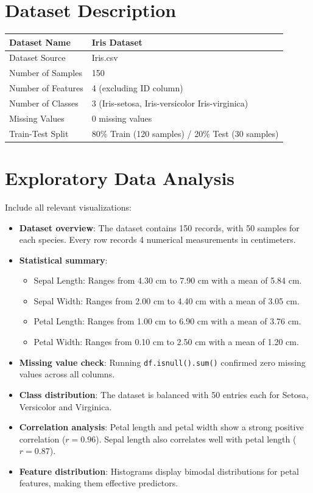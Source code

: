 \documentclass[12pt,a4paper]{article}
\begin{document}
\section{Dataset Description}
\begin{longtable}{|p{6cm}|p{8cm}|}
\hline
Dataset Name & Iris Dataset \\ \hline
Dataset Source & Iris.csv \\ \hline
Number of Samples & 150 \\ \hline
Number of Features & 4 (excluding ID column) \\ \hline
Number of Classes & 3 (Iris-setosa, Iris-versicolor Iris-virginica) \\ \hline
Missing Values & 0 missing values \\ \hline
Train-Test Split & 80\% Train (120 samples) / 20\% Test (30 samples) \\ \hline
\end{longtable}

\section{Exploratory Data Analysis}
Include all relevant visualizations:
\begin{itemize}
\item \textbf{Dataset overview}: The dataset contains 150 records, with 50 samples for each species. Every row records 4 numerical measurements in centimeters.
\item \textbf{Statistical summary}:
\begin{itemize}
\item Sepal Length: Ranges from 4.30 cm to 7.90 cm with a mean of 5.84 cm.
\item Sepal Width: Ranges from 2.00 cm to 4.40 cm with a mean of 3.05 cm.
\item Petal Length: Ranges from 1.00 cm to 6.90 cm with a mean of 3.76 cm.
\item Petal Width: Ranges from 0.10 cm to 2.50 cm with a mean of 1.20 cm.
\end{itemize}
\item \textbf{Missing value check}: Running \texttt{df.isnull().sum()} confirmed zero missing values across all columns.
\item \textbf{Class distribution}: The dataset is balanced with 50 entries each for Setosa, Versicolor and Virginica.
\item \textbf{Correlation analysis}: Petal length and petal width show a strong positive correlation ($r = 0.96$). Sepal length also correlates well with petal length ($r = 0.87$).
\item \textbf{Feature distribution}: Histograms display bimodal distributions for petal features, making them effective predictors.
\end{itemize}
\end{document}
